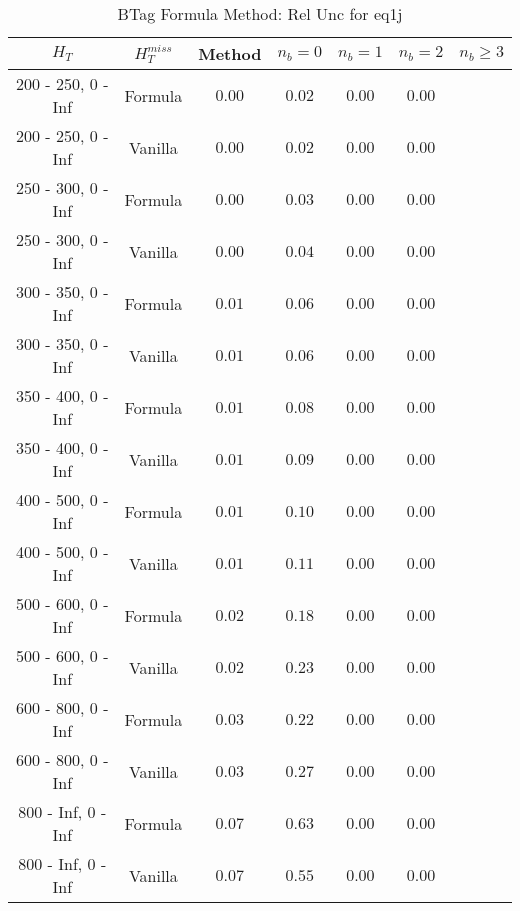 \begin{longtable}{ | c | c | c | c | c | c | c | }
\caption{BTag Formula Method: Rel Unc for eq1j} \label{tab:eq1j} \\    \hline 
$H_{T}$ & $H_{T}^{miss}$ & Method & $n_{b} = 0$ & $n_{b} = 1$ & $n_{b} = 2$ & $n_{b} \ge 3$ \\ \hline 200 -  250,    0 -  Inf & Formula  & $  0.00 $ & $  0.02 $ & $  0.00 $ & $  0.00 $  \\  
 200 -  250,    0 -  Inf & Vanilla  & $  0.00 $ & $  0.02 $ & $  0.00 $ & $  0.00 $  \\ \hline 
 250 -  300,    0 -  Inf & Formula  & $  0.00 $ & $  0.03 $ & $  0.00 $ & $  0.00 $  \\  
 250 -  300,    0 -  Inf & Vanilla  & $  0.00 $ & $  0.04 $ & $  0.00 $ & $  0.00 $  \\ \hline 
 300 -  350,    0 -  Inf & Formula  & $  0.01 $ & $  0.06 $ & $  0.00 $ & $  0.00 $  \\  
 300 -  350,    0 -  Inf & Vanilla  & $  0.01 $ & $  0.06 $ & $  0.00 $ & $  0.00 $  \\ \hline 
 350 -  400,    0 -  Inf & Formula  & $  0.01 $ & $  0.08 $ & $  0.00 $ & $  0.00 $  \\  
 350 -  400,    0 -  Inf & Vanilla  & $  0.01 $ & $  0.09 $ & $  0.00 $ & $  0.00 $  \\ \hline 
 400 -  500,    0 -  Inf & Formula  & $  0.01 $ & $  0.10 $ & $  0.00 $ & $  0.00 $  \\  
 400 -  500,    0 -  Inf & Vanilla  & $  0.01 $ & $  0.11 $ & $  0.00 $ & $  0.00 $  \\ \hline 
 500 -  600,    0 -  Inf & Formula  & $  0.02 $ & $  0.18 $ & $  0.00 $ & $  0.00 $  \\  
 500 -  600,    0 -  Inf & Vanilla  & $  0.02 $ & $  0.23 $ & $  0.00 $ & $  0.00 $  \\ \hline 
 600 -  800,    0 -  Inf & Formula  & $  0.03 $ & $  0.22 $ & $  0.00 $ & $  0.00 $  \\  
 600 -  800,    0 -  Inf & Vanilla  & $  0.03 $ & $  0.27 $ & $  0.00 $ & $  0.00 $  \\ \hline 
 800 -  Inf,    0 -  Inf & Formula  & $  0.07 $ & $  0.63 $ & $  0.00 $ & $  0.00 $  \\  
 800 -  Inf,    0 -  Inf & Vanilla  & $  0.07 $ & $  0.55 $ & $  0.00 $ & $  0.00 $  \\ \hline 
    \hline 
    \hline 
\end{longtable}
